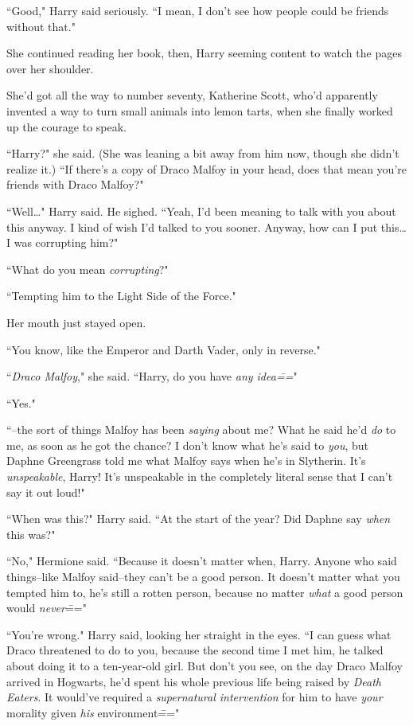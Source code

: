 ``Good," Harry said seriously. ``I mean, I don't see how people could be friends without that."

She continued reading her book, then, Harry seeming content to watch the pages over her shoulder.

She'd got all the way to number seventy, Katherine Scott, who'd apparently invented a way to turn small animals into lemon tarts, when she finally worked up the courage to speak.

``Harry?" she said. (She was leaning a bit away from him now, though she didn't realize it.) ``If there's a copy of Draco Malfoy in your head, does that mean you're friends with Draco Malfoy?"

``Well{\ldots}" Harry said. He sighed. ``Yeah, I'd been meaning to talk with you about this anyway. I kind of wish I'd talked to you sooner. Anyway, how can I put this{\ldots} I was corrupting him?"

``What do you mean \emph{corrupting}?"

``Tempting him to the Light Side of the Force."

Her mouth just stayed open.

``You know, like the Emperor and Darth Vader, only in reverse."

``\emph{Draco Malfoy}," she said. ``Harry, do you have \emph{any idea\===}"

``Yes."

``\---the sort of things Malfoy has been \emph{saying} about me? What he said he'd \emph{do} to me, as soon as he got the chance? I don't know what he's said to \emph{you}, but Daphne Greengrass told me what Malfoy says when he's in Slytherin. It's \emph{unspeakable}, Harry! It's unspeakable in the completely literal sense that I can't say it out loud!"

``When was this?" Harry said. ``At the start of the year? Did Daphne say \emph{when} this was?"

``No," Hermione said. ``Because it doesn't matter when, Harry. Anyone who said things\---like Malfoy said\---they can't be a good person. It doesn't matter what you tempted him to, he's still a rotten person, because no matter \emph{what} a good person would \emph{never}\==="

``You're wrong." Harry said, looking her straight in the eyes. ``I can guess what Draco threatened to do to you, because the second time I met him, he talked about doing it to a ten-year-old girl. But don't you see, on the day Draco Malfoy arrived in Hogwarts, he'd spent his whole previous life being raised by \emph{Death Eaters}. It would've required a \emph{supernatural intervention} for him to have \emph{your} morality given \emph{his} environment\==="

